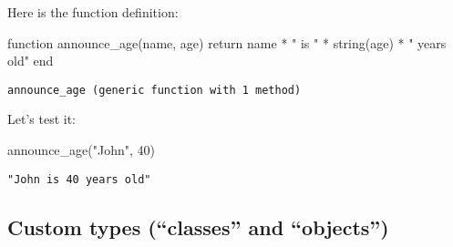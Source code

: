 \documentclass[
  letterpaper,
  DIV=11,
  numbers=noendperiod]{scrartcl}
\newenvironment{Shaded}{\begin{snugshade}}{\end{snugshade}}
\newcommand{\ControlFlowTok}[1]{\textcolor[rgb]{0.00,0.23,0.31}{#1}}
\newcommand{\FloatTok}[1]{\textcolor[rgb]{0.68,0.00,0.00}{#1}}
\newcommand{\FunctionTok}[1]{\textcolor[rgb]{0.28,0.35,0.67}{#1}}
\newcommand{\KeywordTok}[1]{\textcolor[rgb]{0.00,0.23,0.31}{#1}}
\newcommand{\NormalTok}[1]{\textcolor[rgb]{0.00,0.23,0.31}{#1}}
\newcommand{\OperatorTok}[1]{\textcolor[rgb]{0.37,0.37,0.37}{#1}}
\newcommand{\StringTok}[1]{\textcolor[rgb]{0.13,0.47,0.30}{#1}}
\begin{document}
\begin{tcolorbox}[enhanced jigsaw, left=2mm, colbacktitle=quarto-callout-tip-color!10!white, titlerule=0mm, breakable, arc=.35mm, opacitybacktitle=0.6, coltitle=black, opacityback=0, toprule=.15mm, bottomrule=.15mm, colframe=quarto-callout-tip-color-frame, bottomtitle=1mm, rightrule=.15mm, leftrule=.75mm, colback=white, toptitle=1mm, title=\textcolor{quarto-callout-tip-color}{\faLightbulb}\hspace{0.5em}{Answer}]

Here is the function definition:

\begin{Shaded}
\begin{Highlighting}[]
\KeywordTok{function} \FunctionTok{announce\_age}\NormalTok{(name, age)}
  \ControlFlowTok{return}\NormalTok{ name }\OperatorTok{*} \StringTok{" is "} \OperatorTok{*} \FunctionTok{string}\NormalTok{(age) }\OperatorTok{*} \StringTok{" years old"}
\KeywordTok{end}
\end{Highlighting}
\end{Shaded}

\begin{verbatim}
announce_age (generic function with 1 method)
\end{verbatim}

Let's test it:

\begin{Shaded}
\begin{Highlighting}[]
\FunctionTok{announce\_age}\NormalTok{(}\StringTok{"John"}\NormalTok{, }\FloatTok{40}\NormalTok{)}
\end{Highlighting}
\end{Shaded}

\begin{verbatim}
"John is 40 years old"
\end{verbatim}

\end{tcolorbox}

\subsection{Custom types (``classes'' and
``objects'')}\label{custom-types-classes-and-objects}
\end{document}
